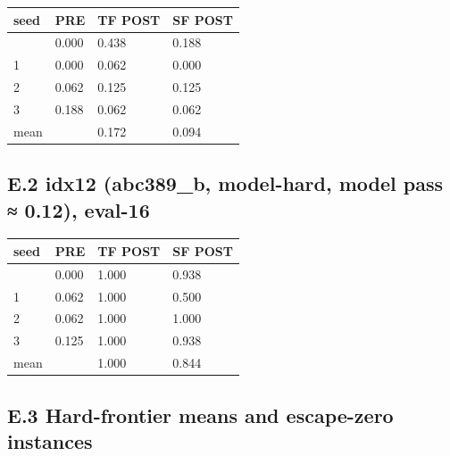 \begin{longtable}[]{@{}llll@{}}
\toprule\noalign{}
seed & PRE & TF POST & SF POST \\
\midrule\noalign{}
\endhead
\bottomrule\noalign{}
\endlastfoot
0 & 0.000 & 0.438 & 0.188 \\
1 & 0.000 & 0.062 & 0.000 \\
2 & 0.062 & 0.125 & 0.125 \\
3 & 0.188 & 0.062 & 0.062 \\
mean & & 0.172 & 0.094 \\
\end{longtable}

\subsection{E.2 idx12 (abc389\_b, model-hard, model pass ≈ 0.12), eval-16}\label{e.2-idx12-abc389_b-model-hard-model-pass-0.12-eval-16}

\begin{longtable}[]{@{}llll@{}}
\toprule\noalign{}
seed & PRE & TF POST & SF POST \\
\midrule\noalign{}
\endhead
\bottomrule\noalign{}
\endlastfoot
0 & 0.000 & 1.000 & 0.938 \\
1 & 0.062 & 1.000 & 0.500 \\
2 & 0.062 & 1.000 & 1.000 \\
3 & 0.125 & 1.000 & 0.938 \\
mean & & 1.000 & 0.844 \\
\end{longtable}

\subsection{E.3 Hard-frontier means and escape-zero instances}\label{e.3-hard-frontier-means-and-escape-zero-instances}


